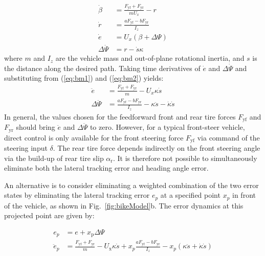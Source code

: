 \documentclass{nVSD2e}
\theoremstyle{plain}
\theoremstyle{definition}
\theoremstyle{remark}
\begin{document}
\begin{subequations}
\label{eq:bm}
\begin{align}
	\dot{\beta} &= \frac{F_\mathrm{yf}+F_\mathrm{yr}}{mU_x} - r \label{eq:bm1}\\
	\dot{r} &= \frac{aF_\mathrm{yf} - bF_\mathrm{yr}}{I_z} \label{eq:bm2} \\
	\dot{e} &= U_x (\beta + \Delta\Psi) \label{eq:bm3} \\
	\Delta\dot{\Psi} &= r - \dot{s}\kappa \label{eq:bm4} 
\end{align}
\end{subequations}
where $m$ and $I_z$ are the vehicle mass and out-of-plane rotational inertia, and $s$ is the distance along the desired path. Taking time derivatives of $\dot{e}$ and $\Delta\dot{\Psi}$ and substituting from (\ref{eq:bm1}) and (\ref{eq:bm2}) yields:
\begin{subequations}
\label{eqn:doubleds}
\begin{align}
	\ddot{e} &= \frac{F_\mathrm{yf}+F_\mathrm{yr}}{m} - U_x\kappa\dot{s} \\
	\Delta\ddot{\Psi} &= \frac{aF_\mathrm{yf} - bF_\mathrm{yr}}{I_z} -\kappa\ddot{s} - \dot{\kappa}\dot{s}
\end{align}
\end{subequations}
In general, the values chosen for the feedforward front and rear tire forces $F_\mathrm{yf}$ and $F_\mathrm{yr}$ should
bring $\ddot{e}$ and $\Delta\ddot{\Psi}$ to zero. However, for a typical front-steer vehicle, 
direct control is only available for the front steering force $F_\mathrm{yf}$ via command of the steering input $\delta$. The rear tire
force depends indirectly on the front steering angle via the build-up of rear tire slip $\alpha_\mathrm{r}$. It is therefore
not possible to simultaneously eliminate both the lateral tracking error and heading angle error. 

An alternative is to consider eliminating a weighted combination of the two error states by eliminating the lateral tracking 
error $e_p$ at a specified point $x_p$ in front of the vehicle, as shown in Fig.~\ref{fig:bikeModel}b. The error dynamics at this projected point are given by: 

\begin{subequations}
\label{eqn:xp}
\begin{align}
	e_p        &= e + x_\mathrm{p}\Delta\Psi \\
	\ddot{e}_p &= \frac{F_\mathrm{yf} + F_\mathrm{yr}}{m} - U_\mathrm{x}\kappa\dot{s} + x_p\frac{aF_\mathrm{yf} - bF_\mathrm{yr}}{I_z} - x_p(\kappa\ddot{s} + \dot{\kappa}\dot{s})
\end{align}
\end{subequations}
\end{document}

